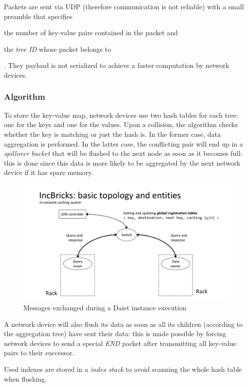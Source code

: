 Packets are sent via UDP (therefore communication is not reliable) with a small preamble that specifies
\begin{mylist}
    \item the number of key-value pairs contained in the packet and
    \item the \textit{tree ID} whose packet belongs to
\end{mylist}.
They payload is not serialized to achieve a faster computation by network devices.

\subsubsection{Algorithm} \label{daiet_algorithm}
To store the key-value map, network devices use two hash tables for each tree: one for the keys and one for the values.
Upon a collision, the algorithm checks whether the key is matching or just the hash is.
In the former case, data aggregation is performed.
In the latter case, the conflicting pair will end up in a \textit{spillover bucket} that will be flushed to the next node as soon as it becomes full: this is done since this data is more likely to be aggregated by the next network device if it has spare memory.

\begin{figure}[!htb]
    \centering
        \includegraphics[page=12, clip, trim=2.1cm 0.3cm 2cm 0.25cm, width=1.00\textwidth]{figures/analysis/inp/presentation.pdf}
    \caption{Messages exchanged during a Daiet \texorpdfstring{\cite{daiet}}{} instance execution}
\end{figure}

A network device will also flush its data as soon as all its children (according to the aggregation tree) have sent their data: this is made possible by forcing network devices to send a special \textit{END} packet after transmitting all key-value pairs to their successor.\par
Used indexes are stored in a \textit{index stack} to avoid scanning the whole hash table when flushing.

